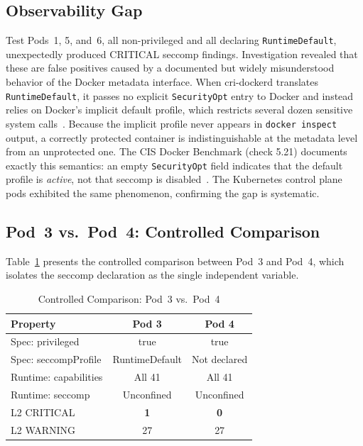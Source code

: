 \documentclass[conference]{IEEEtran}
\begin{document}
\subsection{Observability Gap}
\label{sec:obsgap}

Test Pods~1, 5, and~6, all non-privileged and all declaring \texttt{RuntimeDefault}, unexpectedly produced CRITICAL seccomp findings. Investigation revealed that these are false positives caused by a documented but widely misunderstood behavior of the Docker metadata interface. When cri-dockerd translates \texttt{RuntimeDefault}, it passes no explicit \texttt{SecurityOpt} entry to Docker and instead relies on Docker's implicit default profile, which restricts several dozen sensitive system calls~\cite{dockerseccomp2024}. Because the implicit profile never appears in \texttt{docker inspect} output, a correctly protected container is indistinguishable at the metadata level from an unprotected one. The CIS Docker Benchmark (check 5.21) documents exactly this semantics: an empty \texttt{SecurityOpt} field indicates that the default profile is \emph{active}, not that seccomp is disabled~\cite{cisdocker2024}. The Kubernetes control plane pods exhibited the same phenomenon, confirming the gap is systematic.

\subsection{Pod~3 vs.\ Pod~4: Controlled Comparison}

Table~\ref{tab:comparison} presents the controlled comparison between Pod~3 and Pod~4, which isolates the seccomp declaration as the single independent variable.

\begin{table}[htbp]
\caption{Controlled Comparison: Pod~3 vs.\ Pod~4}
\label{tab:comparison}
\centering
\begin{tabular}{lcc}
\toprule
\textbf{Property} & \textbf{Pod 3} & \textbf{Pod 4} \\
\midrule
Spec: privileged     & true & true \\
Spec: seccompProfile & RuntimeDefault & Not declared \\
Runtime: capabilities & All 41 & All 41 \\
Runtime: seccomp     & Unconfined & Unconfined \\
L2 CRITICAL          & \textbf{1} & \textbf{0} \\
L2 WARNING           & 27 & 27 \\
\bottomrule
\end{tabular}
\end{table}
\end{document}
